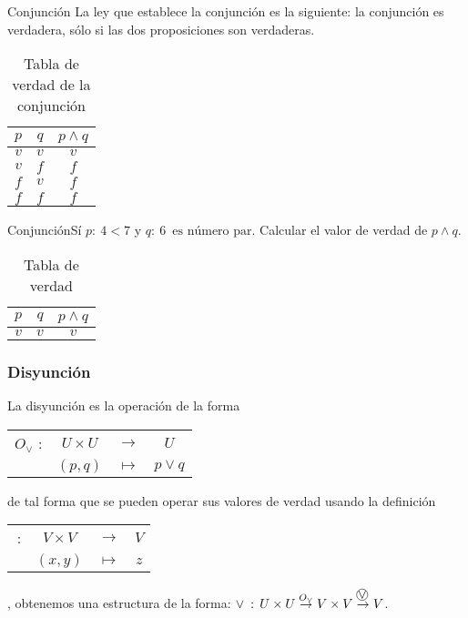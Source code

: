\begin{definicionn}{ Conjunción} La ley que establece la conjunción
es la siguiente: la conjunción es verdadera, sólo si las dos proposiciones
son verdaderas.\end{definicionn} 
\begin{table}[H]
\centering

\caption{Tabla de verdad de la conjunción}


\setlength\arrayrulewidth{1pt} 

\begin{tabular}{c|c|c}
\arrayrulecolor{ptctitle}\hline\cellcolor{ptctitle!50}$p$ & \cellcolor{ptctitle!50}$q$ & \cellcolor{ptctitle!50}$p\wedge q$\tabularnewline
\hline\cellcolor{ptcbackground}$v$ & \cellcolor{ptcbackground} $v$ & \cellcolor{ptcbackground}$v$\tabularnewline
\hline\cellcolor{gray!50}$v$ & \cellcolor{gray!50} $f$ & \cellcolor{gray!50}$f$\tabularnewline
\hline\cellcolor{ptcbackground}$f$ & \cellcolor{ptcbackground} $v$ & \cellcolor{ptcbackground}$f$\tabularnewline
\hline\cellcolor{gray!50}$f$ & \cellcolor{gray!50} $f$ & \cellcolor{gray!50}$f$\tabularnewline
\end{tabular}
\end{table}


\begin{ejem}{Conjunción}Sí $p:\:4<7$ y $q:\ 6\,\mbox{ es número par}$.
Calcular el valor de verdad de $p\wedge q.$ \end{ejem}

\solucion 
\begin{table}[H]
\centering

\caption{Tabla de verdad}


\begin{tabular}{c|c|c}
\arrayrulecolor{ptctitle}\cellcolor{gray!50}$p$ & \cellcolor{gray!50}$q$ & \cellcolor{gray!50}$p\wedge q$\tabularnewline
\hline 
\cellcolor{ptcbackground}$v$ & \cellcolor{ptcbackground}$v$ & \cellcolor{ptcbackground}$v$\tabularnewline
\hline 
\end{tabular}
\end{table}



\subsubsection{Disyunción}

La disyunción es la operación de la forma %
\begin{tabular}{cccc}
$O_{\vee}$ : & $U\times U$ & $\rightarrow$ & %
$U$%
\tabularnewline
 & $\left(p,q\right)$ & $\mapsto$ & $p\vee q$\tabularnewline
\end{tabular}de tal forma que se pueden operar sus valores de verdad usando la
definición %
\begin{tabular}{cccc}
\oper{$\vee$}\,: & $V\times V$ & $\rightarrow$ & %
$V$%
\tabularnewline
 & $\left(x,y\right)$ & $\mapsto$ & $z$\tabularnewline
\end{tabular}, obtenemos una estructura de la forma: $\vee\::\, U\times U\overset{O_{\vee}}{\rightarrow}V\times V\overset{\oper{\ensuremath{\vee}}\,}{\rightarrow}V$.

